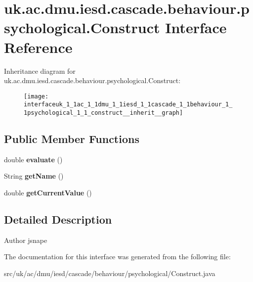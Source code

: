 \hypertarget{interfaceuk_1_1ac_1_1dmu_1_1iesd_1_1cascade_1_1behaviour_1_1psychological_1_1_construct}{\section{uk.\-ac.\-dmu.\-iesd.\-cascade.\-behaviour.\-psychological.\-Construct Interface Reference}
\label{interfaceuk_1_1ac_1_1dmu_1_1iesd_1_1cascade_1_1behaviour_1_1psychological_1_1_construct}
}


Inheritance diagram for uk.\-ac.\-dmu.\-iesd.\-cascade.\-behaviour.\-psychological.\-Construct\-:\nopagebreak
\begin{figure}[H]
\begin{center}
\leavevmode
\texttt{[image: interfaceuk\_1\_1ac\_1\_1dmu\_1\_1iesd\_1\_1cascade\_1\_1behaviour\_1\_1psychological\_1\_1\_construct\_\_inherit\_\_graph]}
\end{center}
\end{figure}
\subsection*{Public Member Functions}
\begin{DoxyCompactItemize}
\item 
\hypertarget{interfaceuk_1_1ac_1_1dmu_1_1iesd_1_1cascade_1_1behaviour_1_1psychological_1_1_construct_ab49029e7ea2485b1b117f32bcf8bc591}{double {\bfseries evaluate} ()}\label{interfaceuk_1_1ac_1_1dmu_1_1iesd_1_1cascade_1_1behaviour_1_1psychological_1_1_construct_ab49029e7ea2485b1b117f32bcf8bc591}

\item 
\hypertarget{interfaceuk_1_1ac_1_1dmu_1_1iesd_1_1cascade_1_1behaviour_1_1psychological_1_1_construct_add16e9957cd684f4fe66ee2c793de1b5}{String {\bfseries get\-Name} ()}\label{interfaceuk_1_1ac_1_1dmu_1_1iesd_1_1cascade_1_1behaviour_1_1psychological_1_1_construct_add16e9957cd684f4fe66ee2c793de1b5}

\item 
\hypertarget{interfaceuk_1_1ac_1_1dmu_1_1iesd_1_1cascade_1_1behaviour_1_1psychological_1_1_construct_a5c0385f9c59ad1467744a409a54c98b1}{double {\bfseries get\-Current\-Value} ()}\label{interfaceuk_1_1ac_1_1dmu_1_1iesd_1_1cascade_1_1behaviour_1_1psychological_1_1_construct_a5c0385f9c59ad1467744a409a54c98b1}

\end{DoxyCompactItemize}


\subsection{Detailed Description}
\begin{DoxyAuthor}{Author}
jsnape 
\end{DoxyAuthor}


The documentation for this interface was generated from the following file\-:\begin{DoxyCompactItemize}
\item 
src/uk/ac/dmu/iesd/cascade/behaviour/psychological/Construct.\-java\end{DoxyCompactItemize}
